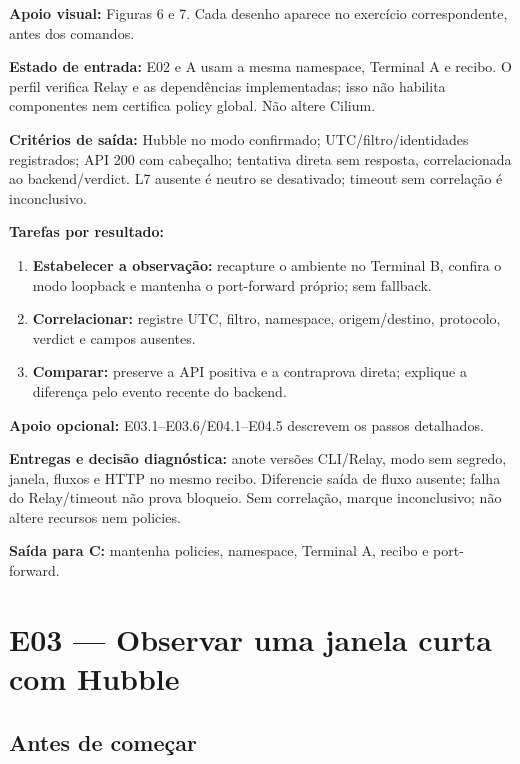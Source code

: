 \documentclass[12pt,openany,oneside,a4paper,chapter=TITLE,english,brazil]{abntex2}
\providecommand{\tightlist}{\setlength{\itemsep}{0pt}\setlength{\parskip}{0pt}}
\begin{document}
\textbf{Apoio visual:} Figuras 6 e 7. Cada desenho aparece no exercício correspondente, antes dos comandos.

\textbf{Estado de entrada:} E02 e A usam a mesma namespace, Terminal A e recibo. O perfil verifica Relay e as dependências implementadas; isso não habilita componentes nem certifica policy global. Não altere Cilium.

\textbf{Critérios de saída:} Hubble no modo confirmado; UTC/filtro/identidades registrados; API 200 com cabeçalho; tentativa direta sem resposta, correlacionada ao backend/verdict. L7 ausente é neutro se desativado; timeout sem correlação é inconclusivo.

\textbf{Tarefas por resultado:}

\begin{enumerate}
\def\labelenumi{\arabic{enumi}.}
\tightlist
\item
  \textbf{Estabelecer a observação:} recapture o ambiente no Terminal B, confira o modo loopback e mantenha o port-forward próprio; sem fallback.
\item
  \textbf{Correlacionar:} registre UTC, filtro, namespace, origem/destino, protocolo, verdict e campos ausentes.
\item
  \textbf{Comparar:} preserve a API positiva e a contraprova direta; explique a diferença pelo evento recente do backend.
\end{enumerate}

\textbf{Apoio opcional:} E03.1--E03.6/E04.1--E04.5 descrevem os passos detalhados.

\textbf{Entregas e decisão diagnóstica:} anote versões CLI/Relay, modo sem segredo, janela, fluxos e HTTP no mesmo recibo. Diferencie saída de fluxo ausente; falha do Relay/timeout não prova bloqueio. Sem correlação, marque inconclusivo; não altere recursos nem policies.

\textbf{Saída para C:} mantenha policies, namespace, Terminal A, recibo e port-forward.

\chapter*{E03 — Observar uma janela curta com Hubble}

\section*{Antes de começar}\label{antes-de-comeuxe7ar-2}
\end{document}
